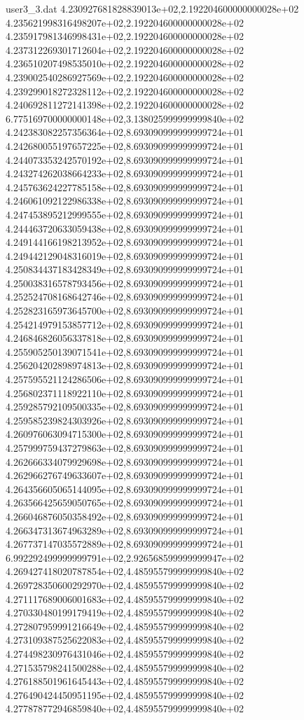 \begin{filecontents}{user3_3.dat}
4.230927681828839013e+02,2.192204600000000028e+02
4.235621998316498207e+02,2.192204600000000028e+02
4.235917981346998431e+02,2.192204600000000028e+02
4.237312269301712604e+02,2.192204600000000028e+02
4.236510207498535010e+02,2.192204600000000028e+02
4.239002540286927569e+02,2.192204600000000028e+02
4.239299018272328112e+02,2.192204600000000028e+02
4.240692811272141398e+02,2.192204600000000028e+02
6.775169700000000148e+02,3.138025999999999840e+02
4.242383082257356364e+02,8.693090999999999724e+01
4.242680055197657225e+02,8.693090999999999724e+01
4.244073353242570192e+02,8.693090999999999724e+01
4.243274262038664233e+02,8.693090999999999724e+01
4.245763624227785158e+02,8.693090999999999724e+01
4.246061092122986338e+02,8.693090999999999724e+01
4.247453895212999555e+02,8.693090999999999724e+01
4.244463720633059438e+02,8.693090999999999724e+01
4.249144166198213952e+02,8.693090999999999724e+01
4.249442129048316019e+02,8.693090999999999724e+01
4.250834437183428349e+02,8.693090999999999724e+01
4.250038316578793456e+02,8.693090999999999724e+01
4.252524708168642746e+02,8.693090999999999724e+01
4.252823165973645700e+02,8.693090999999999724e+01
4.254214979153857712e+02,8.693090999999999724e+01
4.246846826056337818e+02,8.693090999999999724e+01
4.255905250139071541e+02,8.693090999999999724e+01
4.256204202898974813e+02,8.693090999999999724e+01
4.257595521124286506e+02,8.693090999999999724e+01
4.256802371118922110e+02,8.693090999999999724e+01
4.259285792109500335e+02,8.693090999999999724e+01
4.259585239824303926e+02,8.693090999999999724e+01
4.260976063094715300e+02,8.693090999999999724e+01
4.257999759437279863e+02,8.693090999999999724e+01
4.262666334079929698e+02,8.693090999999999724e+01
4.262966276749633607e+02,8.693090999999999724e+01
4.264356605065144095e+02,8.693090999999999724e+01
4.263566425659050765e+02,8.693090999999999724e+01
4.266046876050358492e+02,8.693090999999999724e+01
4.266347313674963289e+02,8.693090999999999724e+01
4.267737147035572889e+02,8.693090999999999724e+01
6.992292499999999791e+02,2.926568599999999947e+02
4.269427418020787854e+02,4.485955799999999840e+02
4.269728350600292970e+02,4.485955799999999840e+02
4.271117689006001683e+02,4.485955799999999840e+02
4.270330480199179419e+02,4.485955799999999840e+02
4.272807959991216649e+02,4.485955799999999840e+02
4.273109387525622083e+02,4.485955799999999840e+02
4.274498230976431046e+02,4.485955799999999840e+02
4.271535798241500288e+02,4.485955799999999840e+02
4.276188501961645443e+02,4.485955799999999840e+02
4.276490424450951195e+02,4.485955799999999840e+02
4.277878772946859840e+02,4.485955799999999840e+02

\end{filecontents}
